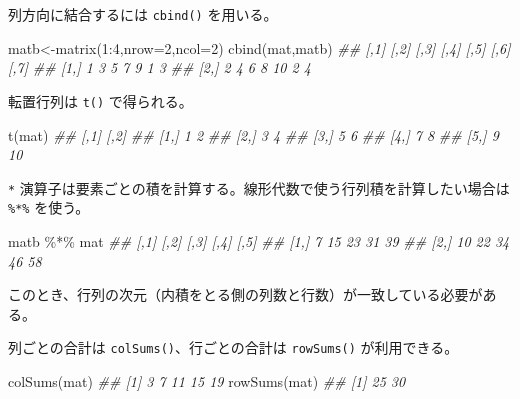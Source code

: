 \documentclass[
  letterpaper,
  xelatex,
  ja=standard, xelatex]{bxjsbook}
\newenvironment{Shaded}{\begin{snugshade}}{\end{snugshade}}
\newcommand{\AttributeTok}[1]{\textcolor[rgb]{0.40,0.45,0.13}{#1}}
\newcommand{\DecValTok}[1]{\textcolor[rgb]{0.68,0.00,0.00}{#1}}
\newcommand{\DocumentationTok}[1]{\textcolor[rgb]{0.37,0.37,0.37}{\textit{#1}}}
\newcommand{\FunctionTok}[1]{\textcolor[rgb]{0.28,0.35,0.67}{#1}}
\newcommand{\NormalTok}[1]{\textcolor[rgb]{0.00,0.23,0.31}{#1}}
\newcommand{\OtherTok}[1]{\textcolor[rgb]{0.00,0.23,0.31}{#1}}
\newcommand{\SpecialCharTok}[1]{\textcolor[rgb]{0.37,0.37,0.37}{#1}}
\begin{document}
列方向に結合するには \texttt{cbind()} を用いる。

\begin{Shaded}
\begin{Highlighting}[]
\NormalTok{matb}\OtherTok{\textless{}{-}}\FunctionTok{matrix}\NormalTok{(}\DecValTok{1}\SpecialCharTok{:}\DecValTok{4}\NormalTok{,}\AttributeTok{nrow=}\DecValTok{2}\NormalTok{,}\AttributeTok{ncol=}\DecValTok{2}\NormalTok{)}
\FunctionTok{cbind}\NormalTok{(mat,matb)}
\DocumentationTok{\#\#      [,1] [,2] [,3] [,4] [,5] [,6] [,7]}
\DocumentationTok{\#\# [1,]    1    3    5    7    9    1    3}
\DocumentationTok{\#\# [2,]    2    4    6    8   10    2    4}
\end{Highlighting}
\end{Shaded}

転置行列は \texttt{t()} で得られる。

\begin{Shaded}
\begin{Highlighting}[]
\FunctionTok{t}\NormalTok{(mat)}
\DocumentationTok{\#\#      [,1] [,2]}
\DocumentationTok{\#\# [1,]    1    2}
\DocumentationTok{\#\# [2,]    3    4}
\DocumentationTok{\#\# [3,]    5    6}
\DocumentationTok{\#\# [4,]    7    8}
\DocumentationTok{\#\# [5,]    9   10}
\end{Highlighting}
\end{Shaded}

\texttt{*}
演算子は要素ごとの積を計算する。線形代数で使う行列積を計算したい場合は
\texttt{\%*\%} を使う。

\begin{Shaded}
\begin{Highlighting}[]
\NormalTok{matb }\SpecialCharTok{\%*\%}\NormalTok{ mat}
\DocumentationTok{\#\#      [,1] [,2] [,3] [,4] [,5]}
\DocumentationTok{\#\# [1,]    7   15   23   31   39}
\DocumentationTok{\#\# [2,]   10   22   34   46   58}
\end{Highlighting}
\end{Shaded}

このとき、行列の次元（内積をとる側の列数と行数）が一致している必要がある。

列ごとの合計は \texttt{colSums()}、行ごとの合計は \texttt{rowSums()}
が利用できる。

\begin{Shaded}
\begin{Highlighting}[]
\FunctionTok{colSums}\NormalTok{(mat)}
\DocumentationTok{\#\# [1]  3  7 11 15 19}
\FunctionTok{rowSums}\NormalTok{(mat)}
\DocumentationTok{\#\# [1] 25 30}
\end{Highlighting}
\end{Shaded}
\end{document}
